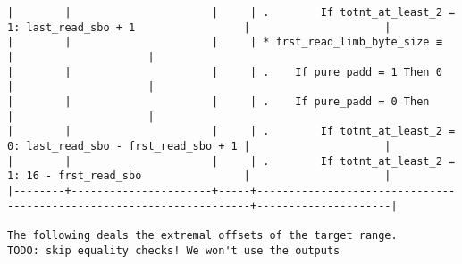 \documentclass[varwidth=\maxdimen,margin=0.5cm,multi={verbatim}]{standalone}
\begin{document}
\begin{verbatim}
|        |                      |     | .        If totnt_at_least_2 = 1: last_read_sbo + 1                 |                     |
|        |                      |     | * frst_read_limb_byte_size ≡                                        |                     |
|        |                      |     | .    If pure_padd = 1 Then 0                                        |                     |
|        |                      |     | .    If pure_padd = 0 Then                                          |                     |
|        |                      |     | .        If totnt_at_least_2 = 0: last_read_sbo - frst_read_sbo + 1 |                     |
|        |                      |     | .        If totnt_at_least_2 = 1: 16 - frst_read_sbo                |                     |
|--------+----------------------+-----+---------------------------------------------------------------------+---------------------|

The following deals the extremal offsets of the target range.
TODO: skip equality checks! We won't use the outputs


\end{verbatim}
\end{document}
